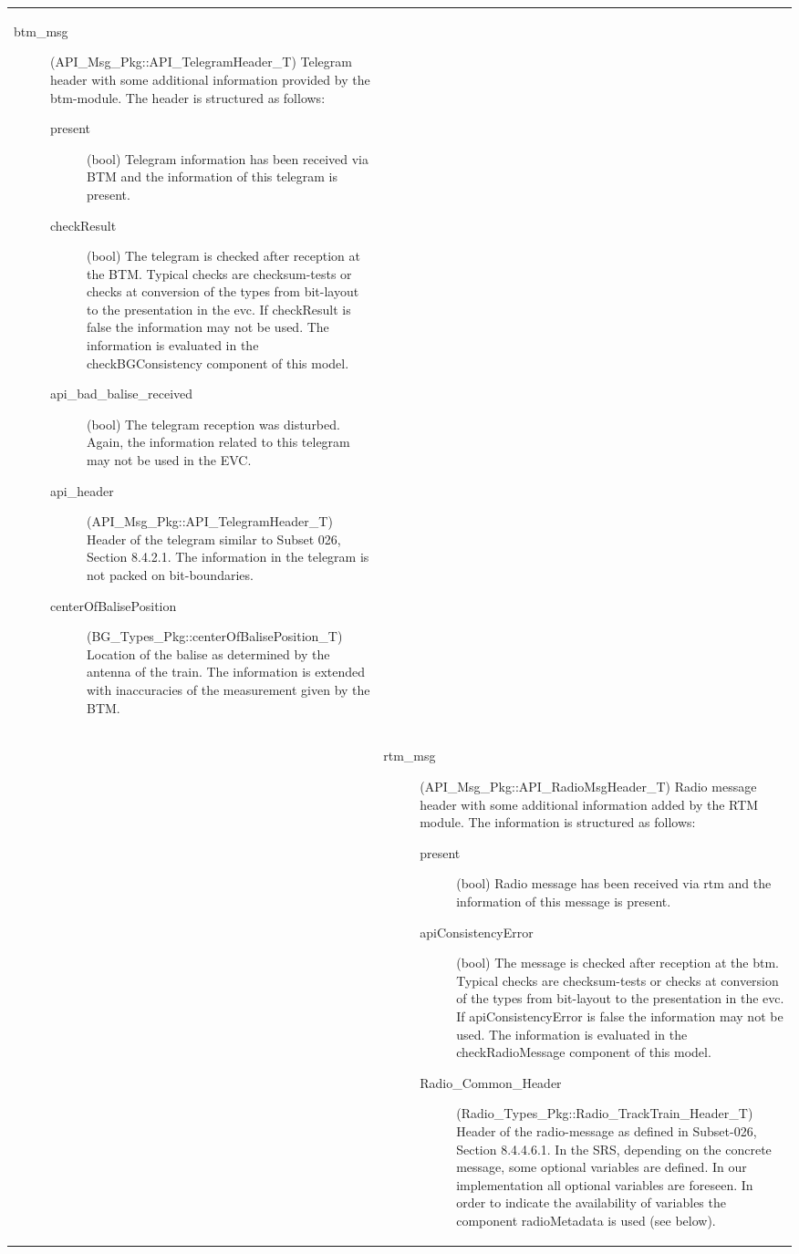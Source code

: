 \begin{longtable}{p{}p{}}
\begin{description}
\item[btm\_msg](API\_Msg\_Pkg::API\_TelegramHeader\_T) Telegram header with some additional information provided by the btm-module. The header is structured as follows:
\begin{description}
\item[present](bool) Telegram information has been received via BTM and the information of this telegram is present. 
\item[checkResult](bool) The telegram is checked after reception at the BTM. Typical checks are checksum-tests or checks at conversion of the types from bit-layout to the presentation in the evc. If checkResult is false the information may not be used. The information is evaluated in the checkBGConsistency component of this model.
\item[api\_bad\_balise\_received](bool) The telegram reception was disturbed. Again, the information related to this telegram may not be used in the EVC.
\item[api\_header](API\_Msg\_Pkg::API\_TelegramHeader\_T) Header of the telegram similar to Subset 026, Section 8.4.2.1. The information in the telegram is not packed on bit-boundaries.
\item[centerOfBalisePosition](BG\_Types\_Pkg::\newline centerOfBalisePosition\_T) Location of the balise as determined by the antenna of the train. The information is extended with inaccuracies of the measurement given by the BTM.
\end{description}
\end{description}\\
&
\begin{description}
\item[rtm\_msg](API\_Msg\_Pkg::API\_RadioMsgHeader\_T) Radio message header with some additional information added by the RTM module. The information is structured as follows:
\begin{description}
\item[present](bool) Radio message has been received via rtm and the information of this message is present. 
\item[apiConsistencyError](bool) The message is checked after reception at the btm. Typical checks are checksum-tests or checks at conversion of the types from bit-layout to the presentation in the evc. If apiConsistencyError is false the information may not be used. The information is evaluated in the checkRadioMessage component of this model.
\item[Radio\_Common\_Header](Radio\_Types\_Pkg::\newline Radio\_TrackTrain\_Header\_T) Header of the radio-message as defined in Subset-026, Section 8.4.4.6.1. In the SRS, depending on the concrete message, some optional variables are defined. In our implementation all optional variables are foreseen. In order to indicate the availability of variables the component radioMetadata is used (see below).

\end{description}
\end{description}
\end{longtable}
